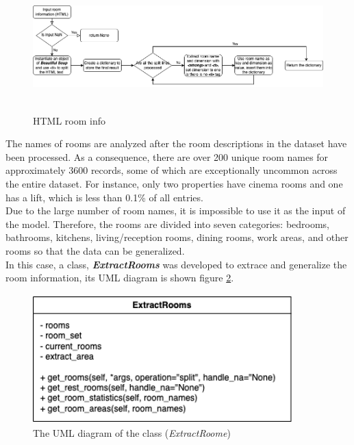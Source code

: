 \documentclass[12pt,twoside]{report}
\begin{document}
\begin{figure}[h]
	\centering
	\includegraphics[width=15cm, height=5cm]{html_room_info}
	\caption{HTML room info}
	\label{html_room_info}
\end{figure}

The names of rooms are analyzed after the room descriptions in the dataset have been processed. As a consequence, there are over 200 unique room names for approximately 3600 records, some of which are exceptionally uncommon across the entire dataset. For instance, only two properties have cinema rooms and one has a lift, which is less than 0.1\% of all entries.  
\\

Due to the large number of room names, it is impossible to use it as the input of the model. Therefore, the rooms are divided into seven categories: bedrooms, bathrooms, kitchens, living/reception rooms, dining rooms, work areas, and other rooms so that the data can be generalized. 
\\

In this case, a class, \textit{\textbf{ExtractRooms}} was developed to extrace and generalize the room information, its UML diagram is shown figure \ref{uml_extract_rooms}.
\begin{figure}[h]
	\centering
	\includegraphics[width=10cm, height=5cm]{uml_extract_rooms}
	\caption{The UML diagram of the class (\textit{ExtractRoome})}
	\label{uml_extract_rooms}
\end{figure}
\end{document}
